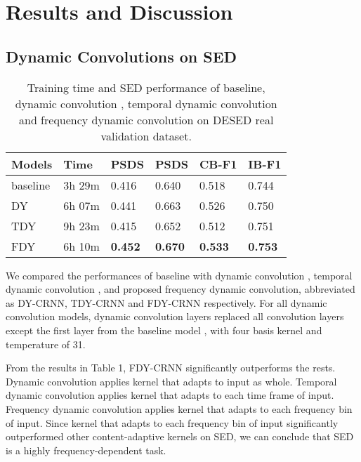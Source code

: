 \documentclass[a4paper]{article}
\begin{document}
 
\vspace{5pt}
\section{Results and Discussion}
\vspace{5pt}
\subsection{Dynamic Convolutions on SED}
\begin{table}[t]
\caption{Training time and SED performance of baseline, dynamic convolution \cite{dyconv}, temporal dynamic convolution \cite{tdycnn} and frequency dynamic convolution on DESED real validation dataset.}
\vspace{-5pt}
\centering
\setlength{\tabcolsep}{4.25pt}

\begin{tabular}{l|lllll}
\hline
\textbf{Models} & \textbf{Time} & \textbf{PSDS} & \textbf{PSDS} & \textbf{CB-F1} & \textbf{IB-F1} \\ \hline
baseline          & 3h 29m & 0.416          & 0.640          & 0.518          & 0.744          \\
DY \cite{dyconv}  & 6h 07m & 0.441          & 0.663          & 0.526          & 0.750          \\
TDY \cite{tdycnn} & 9h 23m & 0.415          & 0.652          & 0.512          & 0.751          \\
FDY               & 6h 10m & \textbf{0.452} & \textbf{0.670} & \textbf{0.533} & \textbf{0.753} \\ \hline
\end{tabular}
\vspace{-5pt}
\label{tab:dyconvs}
\end{table}

\vspace{-5pt}
We compared the performances of baseline with dynamic convolution \cite{dyconv}, temporal dynamic convolution \cite{tdycnn}, and proposed frequency dynamic convolution, abbreviated as DY-CRNN, TDY-CRNN and FDY-CRNN respectively. For all dynamic convolution models, dynamic convolution layers replaced all convolution layers except the first layer from the baseline model \cite{dyconv}, with four basis kernel and temperature of 31.

From the results in Table 1, FDY-CRNN significantly outperforms the rests. Dynamic convolution applies kernel that adapts to input as whole. Temporal dynamic convolution applies kernel that adapts to each time frame of input. Frequency dynamic convolution applies kernel that adapts to each frequency bin of input. Since kernel that adapts to each frequency bin of input significantly outperformed other content-adaptive kernels on SED, we can conclude that SED is a highly frequency-dependent task.
\end{document}
